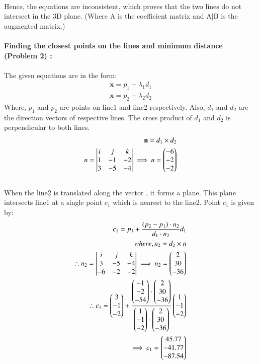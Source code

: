 \documentclass[journal,12pt,twocolumn]{IEEEtran}
\begin{document}
\\
Hence, the equations are inconsistent, which proves that the two lines do not intersect in the 3D plane. (Where A is the coefficient matrix and A$\mid$B is the augmented matrix.) \\
\\
\noindent
\textbf{Finding the closest points on the lines and minimum distance (Problem 2) :}\\
\\
The given equations are in the form:
\begin{align}
    \textbf{x}=p_1 + \lambda_1d_1\\
    \textbf{x}=p_2 + \lambda_2d_2
\end{align}
Where, $p_1$ and $p_2$ are points on line1 and line2 respectively. Also, $d_1$ and $d_2$ are the direction vectors of respective lines.
The cross product of $d_1$ and $d_2$ is perpendicular to both lines.
\begin{align}
    \mathbf{n} = d_1 \times d_2\\
     n=\begin{vmatrix}i & j & k\\1 &-1 &-2\\3&-5&-4\end{vmatrix}
     \implies n=\begin{pmatrix}-6 \\ -2 \\ -2 \end{pmatrix}
\end{align}
\\
When the line2 is translated along the vector , it forms a plane. This plane intersects line1 at a single point $c_1$ which is nearest to the line2. Point $c_1$ is given by:
\\
\begin{align}
c_1=p_1+\frac{(p_2-p_1)\cdot n_2}{d_1\cdot n_2}d_1 \\
where, n_2=d_2\times n\\
 \therefore n_2=\begin{vmatrix}i & j & k\\3 &-5 &-4\\-6&-2&-2\end{vmatrix}
\implies n_2=\begin{pmatrix}2 \\ 30 \\ -36\end{pmatrix}\\
\therefore c_1= \begin{pmatrix}3\\-1\\-2\end{pmatrix}+\frac{\begin{pmatrix}-1\\-2\\-54\end{pmatrix}\cdot \begin{pmatrix}2\\30\\-36\end{pmatrix}}{\begin{pmatrix}1\\-1\\-2\end{pmatrix}\cdot \begin{pmatrix}2\\30\\-36\end{pmatrix}}\begin{pmatrix}1\\-1\\-2\end{pmatrix}\\
\implies c_1=\begin{pmatrix}45.77 \\ -41.77\\ -87.54\end{pmatrix}
\end{align}
\end{document}
